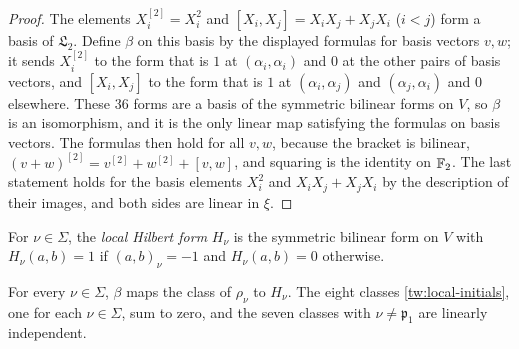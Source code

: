 \begin{proof}
The elements $X_i^{[2]}=X_i^2$ and $[X_i,X_j]=X_iX_j+X_jX_i$ ($i<j$) form a
basis of $\mathfrak L_2$. Define $\beta$ on this basis by the displayed
formulas for basis vectors $v,w$; it sends $X_i^{[2]}$ to the form that is $1$
at $(\alpha_i,\alpha_i)$ and $0$ at the other pairs of basis vectors, and
$[X_i,X_j]$ to the form that is $1$ at $(\alpha_i,\alpha_j)$ and
$(\alpha_j,\alpha_i)$ and $0$ elsewhere. These $36$ forms are a basis of the
symmetric bilinear forms on $V$, so $\beta$ is an isomorphism, and it is the
only linear map satisfying the formulas on basis vectors. The formulas then
hold for all $v,w$, because the bracket is bilinear,
$(v+w)^{[2]}=v^{[2]}+w^{[2]}+[v,w]$, and squaring is the identity on $\mathbb F_2$.
The last statement holds for the basis elements $X_i^2$ and
$X_iX_j+X_jX_i$ by the description of their images, and both sides are
linear in $\xi$.
\end{proof}

\begin{definition}\label{tw:hilbert-form}
For $\nu\in\Sigma$, the \emph{local Hilbert form} $H_\nu$ is the symmetric
bilinear form on $V$ with $H_\nu(a,b)=1$ if $(a,b)_\nu=-1$ and
$H_\nu(a,b)=0$ otherwise.
\end{definition}

\begin{lemma}\label{tw:local-forms}
For every $\nu\in\Sigma$, $\beta$ maps the class of $\rho_\nu$ to $H_\nu$. The
eight classes \eqref{tw:local-initials}, one for each $\nu\in\Sigma$, sum to
zero, and the seven classes with $\nu\ne\mathfrak p_1$ are linearly
independent.
\end{lemma}


